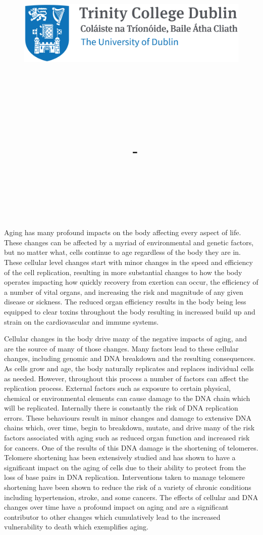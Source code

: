 \documentclass{article}
\title{
    \vspace{-1in}
    \begin{figure}[!ht]
    \flushleft
    \includegraphics[width=0.4\linewidth]{reduced-trinity.png}
    \end{figure}
    \vspace{-0.5cm}
    \hrulefill \\
    \vspace{1cm}
    \textmd{\textbf{\moduleCode\ \moduleName}}\\
    \textmd{\textbf{\assignmentTitle}}\\
    \textmd{\authorName\ - \authorID}\\
    \textmd{\reportDate}\\
    \vspace{0.5cm}
    \hrulefill \\
}
\date{}
\author{}
\begin{document}
    \lstset{language=bash, float=h, captionpos=b, frame=single, numbers=left, numberblanklines=false, numberstyle=\tiny, numbersep=1mm, framexleftmargin=3mm, xleftmargin=5mm, aboveskip=3mm, breaklines=true}
    \captionsetup{width=.8\linewidth} 

    \maketitle
    \newpage

Aging has many profound impacts on the body affecting every aspect of life. These changes can be affected by a myriad of environmental and genetic factors, but no matter what, cells continue to age regardless of the body they are in. These cellular level changes start with minor changes in the speed and efficiency of the cell replication, resulting in more substantial changes to how the body operates impacting how quickly recovery from exertion can occur, the efficiency of a number of vital organs, and increasing the risk and magnitude of any given disease or sickness. The reduced organ efficiency results in the body being less equipped to clear toxins throughout the body resulting in increased build up and strain on the cardiovascular and immune systems.


Cellular changes in the body drive many of the negative impacts of aging, and are the source of many of those changes. Many factors lead to these cellular changes, including genomic and DNA breakdown and the resulting consequences. As cells grow and age, the body naturally replicates and replaces individual cells as needed. However, throughout this process a number of factors can affect the replication process. External factors such as exposure to certain physical, chemical or environmental elements can cause damage to the DNA chain which will be replicated. Internally there is constantly the risk of DNA replication errors. These behaviours result in minor changes and damage to extensive DNA chains which, over time, begin to breakdown, mutate, and drive many of the risk factors associated with aging such as reduced organ function and increased risk for cancers. One of the results of this DNA damage is the shortening of telomeres. Telomere shortening has been extensively studied and has shown to have a significant impact on the aging of cells due to their ability to protect from the loss of base pairs in DNA replication. Interventions taken to manage telomere shortening have been shown to reduce the risk of a variety of chronic conditions including hypertension, stroke, and some cancers. The effects of cellular and DNA changes over time have a profound impact on aging and are a significant contributor to other changes which cumulatively lead to the increased vulnerability to death which exemplifies aging.
\end{document}
